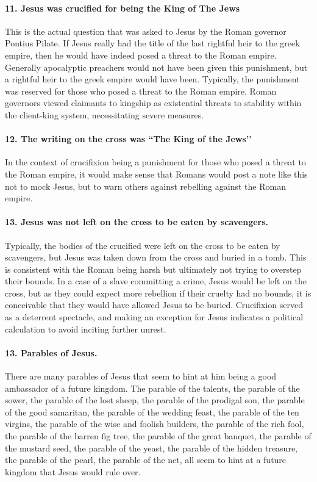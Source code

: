 \paragraph{11.
Jesus was crucified for being the King of The Jews}\label{par:jesus-was-crucified-for-being-the-king-of-the-jews}
This is the actual question that was asked to Jesus by the Roman governor Pontius Pilate.
If Jesus really had the title of the last rightful heir to the greek empire, then he would have indeed posed a threat to the Roman empire.
Generally apocalyptic preachers would not have been given this punishment, but a rightful heir to the greek empire would have been.
Typically, the punishment was reserved for those who posed a threat to the Roman empire.
Roman governors viewed claimants to kingship as existential threats to stability within the client-king system, necessitating severe measures.
\paragraph{12.
The writing on the cross was ``The King of the Jews’’}\label{par:the-writing-on-the-cross-was-the-king-of-the-jews}
In the context of crucifixion being a punishment for those who posed a threat to the Roman empire, it would make sense that Romans would post a note like this not to mock Jesus, but to warn others against rebelling against the Roman empire.
\paragraph{13.
Jesus was not left on the cross to be eaten by scavengers.}\label{par:jesus-was-not-left-on-the-cross-to-be-eaten-by-scavengers.}
Typically, the bodies of the crucified were left on the cross to be eaten by scavengers, but Jesus was taken down from the cross and buried in a tomb.
This is consistent with the Roman being harsh but ultimately not trying to overstep their bounds.
In a case of a slave committing a crime, Jesus would be left on the cross, but as they could expect more rebellion if their cruelty had no bounds, it is conceivable that they would have allowed Jesus to be buried.
Crucifixion served as a deterrent spectacle, and making an exception for Jesus indicates a political calculation to avoid inciting further unrest.
\paragraph{13.
Parables of Jesus.}\label{par:parables-of-jesus.}
There are many parables of Jesus that seem to hint at him being a good ambassador of a future kingdom.
The parable of the talents, the parable of the sower, the parable of the lost sheep, the parable of the prodigal son, the parable of the good samaritan, the parable of the wedding feast, the parable of the ten virgins, the parable of the wise and foolish builders, the parable of the rich fool, the parable of the barren fig tree, the parable of the great banquet, the parable of the mustard seed, the parable of the yeast, the parable of the hidden treasure, the parable of the pearl, the parable of the net, all seem to hint at a future kingdom that Jesus would rule over.

